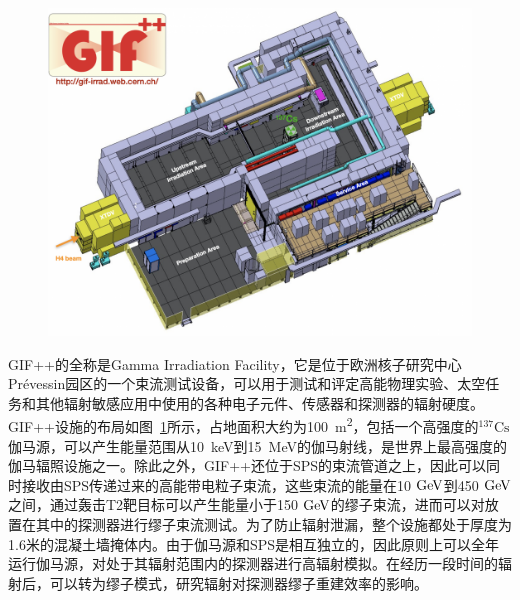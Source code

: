 \begin{figure}[!htbp]
    \centering
    \includegraphics[width=1.0\textwidth]{figures/chapter05/GIF_layout.png}
    \label{fig:c05f11}
\end{figure}

GIF++的全称是Gamma Irradiation Facility，它是位于欧洲核子研究中心Prévessin园区的一个束流测试设备，可以用于测试和评定高能物理实验、太空任务和其他辐射敏感应用中使用的各种电子元件、传感器和探测器的辐射硬度。GIF++设施的布局如图~\ref{fig:c05f11}所示，占地面积大约为100~\si{\m^{2}}，包括一个高强度的$^{137}\mathrm{Cs}$伽马源，可以产生能量范围从10~\si{\keV}到15~\si{\MeV}的伽马射线，是世界上最高强度的伽马辐照设施之一。除此之外，GIF++还位于SPS的束流管道之上，因此可以同时接收由SPS传递过来的高能带电粒子束流，这些束流的能量在10$\GeV$到450$\GeV$之间，通过轰击T2靶目标可以产生能量小于150$\GeV$的缪子束流，进而可以对放置在其中的探测器进行缪子束流测试。为了防止辐射泄漏，整个设施都处于厚度为1.6米的混凝土墙掩体内。由于伽马源和SPS是相互独立的，因此原则上可以全年运行伽马源，对处于其辐射范围内的探测器进行高辐射模拟。在经历一段时间的辐射后，可以转为缪子模式，研究辐射对探测器缪子重建效率的影响。

